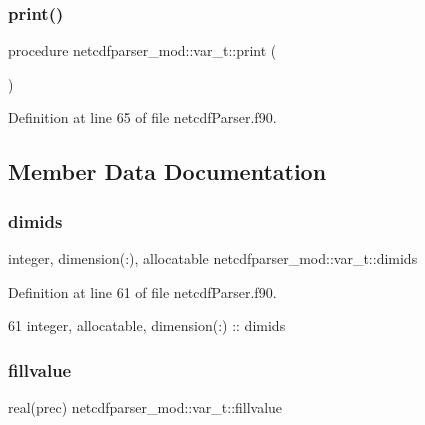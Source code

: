 \subsubsection{\texorpdfstring{print()}{print()}}
{\footnotesize\ttfamily procedure netcdfparser\+\_\+mod\+::var\+\_\+t\+::print (\begin{DoxyParamCaption}{ }\end{DoxyParamCaption})\hspace{0.3cm}{\ttfamily [private]}}



Definition at line 65 of file netcdf\+Parser.\+f90.



\subsection{Member Data Documentation}
\mbox{\label{structnetcdfparser__mod_1_1var__t_a1bb991339dd3410a02d8e36a70672e61}} 
\subsubsection{\texorpdfstring{dimids}{dimids}}
{\footnotesize\ttfamily integer, dimension(\+:), allocatable netcdfparser\+\_\+mod\+::var\+\_\+t\+::dimids\hspace{0.3cm}{\ttfamily [private]}}



Definition at line 61 of file netcdf\+Parser.\+f90.


\begin{DoxyCode}
61         \textcolor{keywordtype}{integer}, \textcolor{keywordtype}{allocatable}, \textcolor{keywordtype}{dimension(:)} :: dimids
\end{DoxyCode}
\mbox{\label{structnetcdfparser__mod_1_1var__t_a8e89e092236a61f096a44ad123d4d35e}} 
\subsubsection{\texorpdfstring{fillvalue}{fillvalue}}
{\footnotesize\ttfamily real(prec) netcdfparser\+\_\+mod\+::var\+\_\+t\+::fillvalue\hspace{0.3cm}{\ttfamily [private]}}



